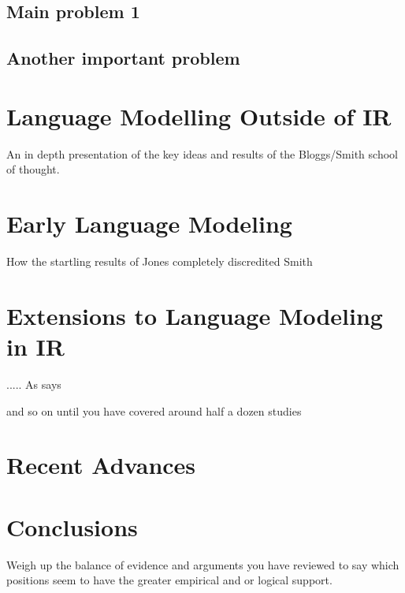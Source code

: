 \documentclass[a4paper,portrait,12pt]{article}
\begin{document}
   \subsection{Main problem 1}
   \subsection{Another important problem}
 \section{Language Modelling Outside of IR}
 
  An in depth presentation of the key ideas and results of the Bloggs/Smith
  school of thought\citep{SYMBOL}.
  
 \section{Early Language Modeling}
 
 How the startling results of Jones\citep{Hayes89} completely discredited Smith
 
 \section{Extensions to Language Modeling in IR}
 ..... As \citet{Einstein} says
 
 and so on until you have covered around half a dozen studies
 
\section{Recent Advances}

\section{Conclusions}
Weigh up the balance of evidence and arguments you have reviewed to say which
positions seem to have the greater empirical and or logical support.




 

\end{document}
